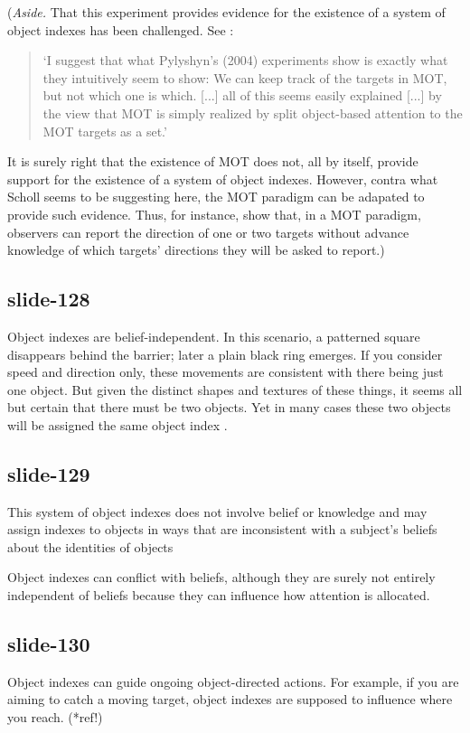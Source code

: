 \documentclass[12pt,\papersize]{extarticle}
\begin{document}
(\emph{Aside.} That this experiment provides evidence for the existence of
a system of object indexes has been challenged.
See \citet[p.\ 59]{scholl:2009_what}:
\begin{quote}
`I suggest that what Pylyshyn’s (2004) experiments show is exactly what they intuitively
seem to show: We can keep track of the targets in MOT, but not which one is which.
[...]
all of this seems easily explained [...] by the view
that MOT is simply realized by split object-based attention to the MOT targets as a set.'
\end{quote}
It is surely right that the existence of MOT does not, all by itself,
provide support for the existence of a system of object indexes.
However, contra what Scholl seems to be suggesting here, the MOT paradigm
can be adapated to provide such evidence.
Thus, for instance, \citet{horowitz:2010_direction} show that, in a MOT paradigm, observers
can report the direction of one or two targets without advance knowledge of which
targets' directions they will be asked to report.)
 
\subsection{slide-128}
Object indexes are belief-independent.
In this scenario,
a patterned square disappears behind the barrier; later a plain black ring emerges.
If you consider speed and direction only, these movements are consistent with there being just one object.
But given the distinct shapes and textures of these things, it seems all but certain that there must be two objects.
Yet in many cases these two objects will be assigned the same object index \citep{flombaum:2006_temporal,mitroff:2007_space}.
 
\subsection{slide-129}
This system of object indexes
does not involve belief or knowledge
and may assign indexes to objects in ways that are inconsistent with
a subject’s beliefs about the identities of objects
\citep[e.g.][]{Mitroff:2004pc, mitroff:2007_space}
 
Object indexes can conflict with beliefs, although they are surely not
entirely independent of beliefs because they can influence how
attention is allocated.
 
\subsection{slide-130}
Object indexes can guide ongoing object-directed actions.
For example, if you are aiming to catch a moving target,
object indexes are supposed to influence where you reach. (*ref!)
 
\end{document}
